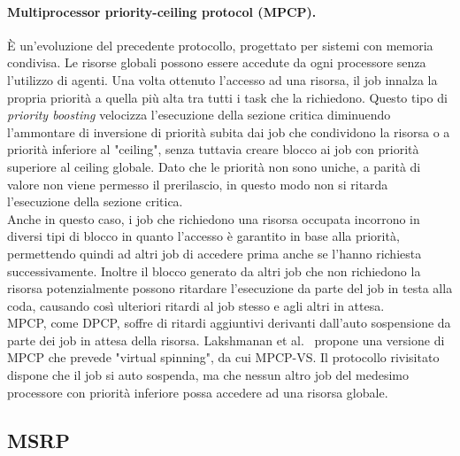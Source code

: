 \paragraph{Multiprocessor priority-ceiling protocol (MPCP).} \`E un'evoluzione del precedente protocollo, progettato per sistemi con memoria condivisa. Le risorse globali possono essere accedute da ogni processore senza l'utilizzo di agenti. Una volta ottenuto l'accesso ad una risorsa, il job innalza la propria priorità a quella più alta tra tutti i task che la richiedono. Questo tipo di \textit{priority boosting} velocizza l'esecuzione della sezione critica diminuendo l'ammontare di inversione di priorità subita dai job che condividono la risorsa o a priorità inferiore al "ceiling", senza tuttavia creare blocco ai job con priorità superiore al ceiling globale. Dato che le priorità non sono uniche, a parità di valore non viene permesso il prerilascio, in questo modo non si ritarda l'esecuzione della sezione critica.\\
Anche in questo caso, i job che richiedono una risorsa occupata incorrono in diversi tipi di blocco in quanto l'accesso è garantito in base alla priorità, permettendo quindi ad altri job di accedere prima anche se l'hanno richiesta successivamente. Inoltre il blocco generato da altri job che non richiedono la risorsa potenzialmente possono ritardare l'esecuzione da parte del job in testa alla coda, causando così ulteriori ritardi al job stesso e agli altri in attesa.\\

MPCP, come DPCP, soffre di ritardi aggiuntivi derivanti dall'auto sospensione da parte dei job in attesa della risorsa. Lakshmanan et al.~\cite{5368127} propone una versione di MPCP che prevede "virtual spinning", da cui MPCP-VS. Il protocollo rivisitato dispone che il job si auto sospenda, ma che nessun altro job del medesimo processore con priorità inferiore possa accedere ad una risorsa globale.\\

\subsection{MSRP}
\label{sec:lockProtocols.msrp}


